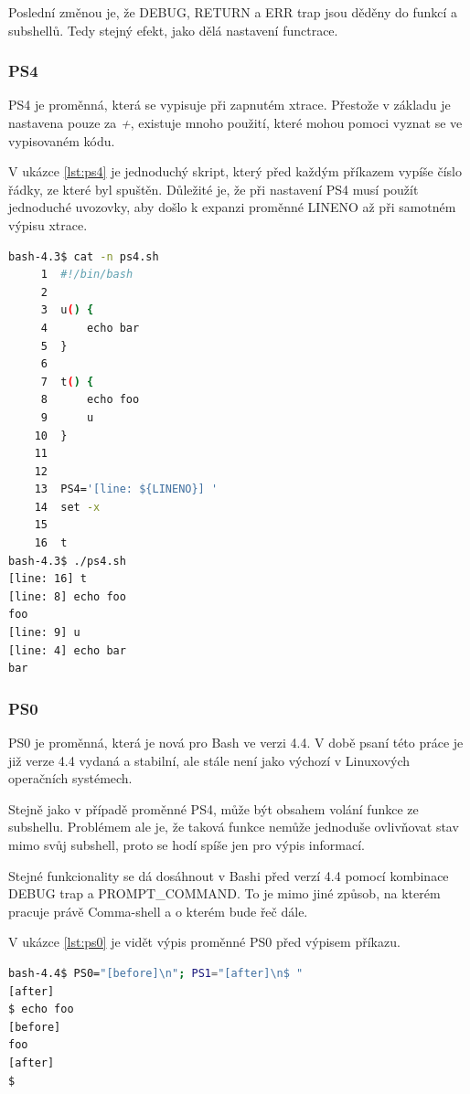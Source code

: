 \documentclass[thesis=M,czech]{FITthesis}[2012/06/26]
\begin{document}
Poslední změnou je, že DEBUG, RETURN a ERR trap jsou děděny do funkcí a subshellů. Tedy stejný efekt, jako dělá nastavení functrace.

%
%
%
\subsubsection{PS4}
PS4 je proměnná, která se vypisuje při zapnutém xtrace. Přestože v základu je nastavena pouze za \textit{+}, existuje mnoho použití, které mohou pomoci vyznat se ve vypisovaném kódu. 

V ukázce \ref{lst:ps4} je jednoduchý skript, který před každým příkazem vypíše číslo řádky, ze které byl spuštěn. Důležité je, že při nastavení PS4 musí použít jednoduché uvozovky, aby došlo k expanzi proměnné LINENO až při samotném výpisu xtrace.

\begin{minipage}{\linewidth}
\begin{lstlisting}[language=bash, caption={ps4}, label={lst:ps4}]
bash-4.3$ cat -n ps4.sh 
     1	#!/bin/bash
     2	
     3	u() {
     4		echo bar
     5	}
     6	
     7	t() {
     8		echo foo
     9		u
    10	}
    11	
    12	
    13	PS4='[line: ${LINENO}] '
    14	set -x
    15	
    16	t
bash-4.3$ ./ps4.sh 
[line: 16] t
[line: 8] echo foo
foo
[line: 9] u
[line: 4] echo bar
bar
\end{lstlisting}
\end{minipage}

%
%
%
\subsubsection{PS0}

PS0 je proměnná, která je nová pro Bash ve verzi 4.4. V době psaní této práce je již verze 4.4 vydaná a stabilní, ale stále není jako výchozí v Linuxových operačních systémech.

Stejně jako v případě proměnné PS4, může být obsahem volání funkce ze subshellu. Problémem ale je, že taková funkce nemůže jednoduše ovlivňovat stav mimo svůj subshell, proto se hodí spíše jen pro výpis informací.

Stejné funkcionality se dá dosáhnout v Bashi před verzí 4.4 pomocí kombinace DEBUG trap a PROMPT\_COMMAND. To je mimo jiné způsob, na kterém pracuje právě Comma-shell a o kterém bude řeč dále.

V ukázce \ref{lst:ps0} je vidět výpis proměnné PS0 před výpisem příkazu.

\begin{lstlisting}[language=bash, caption={ps0}, label={lst:ps0}]
bash-4.4$ PS0="[before]\n"; PS1="[after]\n$ "
[after]
$ echo foo
[before]
foo
[after]
$ 
\end{lstlisting}
\end{document}

